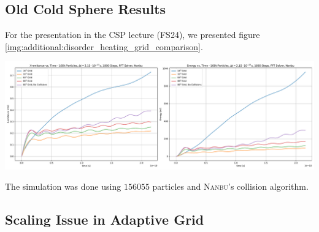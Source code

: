 \subsection{Old Cold Sphere Results}

For the presentation in the CSP lecture (FS24), we presented figure \ref{img:additional:disorder_heating_grid_comparison}. \\
\begin{minipage}[h]{\linewidth}
    \vspace{5pt}
    \centering
    \includegraphics[width=\linewidth]{ressources/additional/disorder_heating_grid_comparison.pdf}
    \label{img:additional:disorder_heating_grid_comparison}
    \vspace{5pt}
\end{minipage}
The simulation was done using $156055$ particles and \textsc{Nanbu}'s collision algorithm.


\subsection{Scaling Issue in Adaptive Grid}

